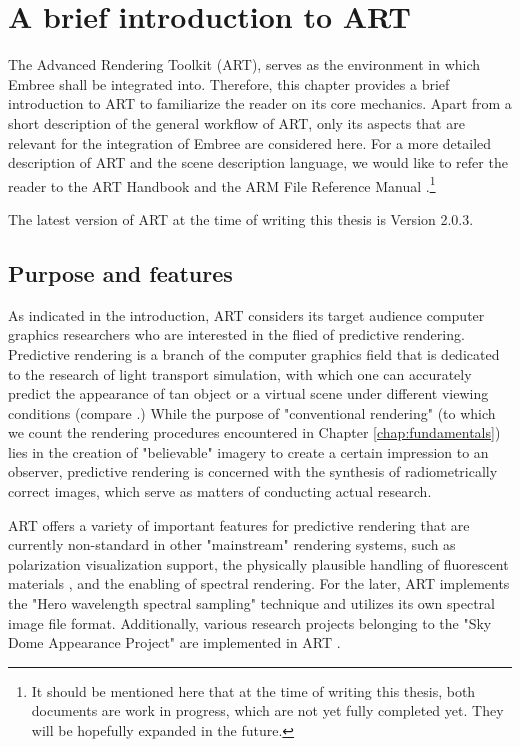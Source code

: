 \chapter{A brief introduction to ART}
The Advanced Rendering Toolkit (ART), serves as the environment in which Embree shall be integrated into. Therefore, this chapter provides a brief introduction to ART to familiarize the reader on its core mechanics. Apart from a short description of the general workflow of ART, only its aspects that are relevant for the integration of Embree are considered here. For a more detailed description of ART and the scene description language, we would like to refer the reader to the ART Handbook \cite{arthandbook} and the ARM File Reference Manual \cite{artreferencemanual}.\footnote{It should be mentioned here that at the time of writing this thesis, both documents are work in progress, which are not yet fully completed yet. They will be hopefully expanded in the future.}

The latest version of ART at the time of writing this thesis is Version 2.0.3.


\section{Purpose and features}

As indicated in the introduction, ART considers its target audience computer graphics researchers who are interested in the flied of predictive rendering. Predictive rendering is a branch of the computer graphics field that is dedicated to the research of light transport simulation, with which one can accurately predict the appearance of tan object or a virtual scene under different viewing conditions (compare \cite{wilkie2009predictive}.)  While the purpose of "conventional rendering" (to which we count the rendering procedures encountered in Chapter \ref{chap:fundamentals}) lies in the creation of "believable" imagery to create a certain impression to an observer, predictive rendering is concerned with the synthesis of radiometrically correct images, which serve as matters of conducting actual  research.

ART offers a variety of important features for predictive rendering that are currently non-standard in other "mainstream" rendering systems, such as polarization visualization support, the physically plausible handling of fluorescent materials \cite{mojzik2018handling}, and the enabling of spectral rendering. For the later, ART implements the "Hero wavelength spectral sampling" technique \cite{wilkie2014hero} and utilizes its own spectral image file format. Additionally, various research projects belonging to the "Sky Dome Appearance Project" are implemented in ART \cite{hosek2012analytic, hovsek2013adding, wilkie2013predicting}.


